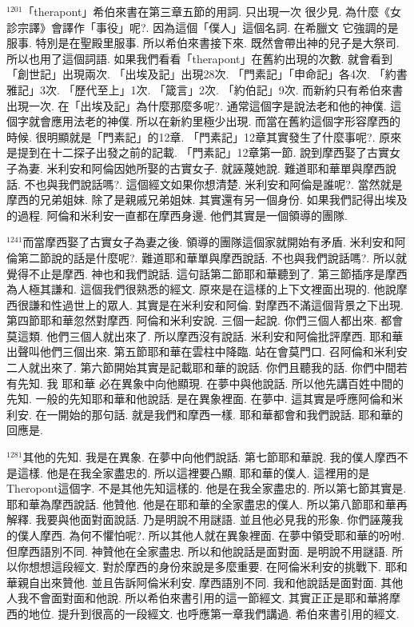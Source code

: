 \documentclass{book}
\begin{document}
$^{1201}$「therapont」希伯來書在第三章五節的用詞.
只出現一次 很少見.
為什麼《女診宗譯》會譯作「事役」呢?.
因為這個「僕人」這個名詞.
在希臘文 它強調的是服事.
特別是在聖殿里服事.
所以希伯來書接下來.
既然會帶出神的兒子是大祭司.
所以也用了這個詞語.
如果我們看看「therapont」在舊約出現的次數.
就會看到「創世記」出現兩次.
「出埃及記」出現28次.
「門素記」「申命記」各4次.
「約書雅記」3次.
「歷代至上」1次.
「箴言」2次.
「約伯記」9次.
而新約只有希伯來書出現一次.
在「出埃及記」為什麼那麼多呢?.
通常這個字是說法老和他的神僕.
這個字就會應用法老的神僕.
所以在新約里極少出現.
而當在舊約這個字形容摩西的時候.
很明顯就是「門素記」的12章.
「門素記」12章其實發生了什麼事呢?.
原來是提到在十二探子出發之前的記載.
「門素記」12章第一節.
說到摩西娶了古實女子為妻.
米利安和阿倫因她所娶的古實女子.
就誣蔑她說.
難道耶和華單與摩西說話.
不也與我們說話嗎?.
這個經文如果你想清楚.
米利安和阿倫是誰呢?.
當然就是摩西的兄弟姐妹.
除了是親戚兄弟姐妹.
其實還有另一個身份.
如果我們記得出埃及的過程.
阿倫和米利安一直都在摩西身邊.
他們其實是一個領導的團隊.

$^{1241}$而當摩西娶了古實女子為妻之後.
領導的團隊這個家就開始有矛盾.
米利安和阿倫第二節說的話是什麼呢?.
難道耶和華單與摩西說話.
不也與我們說話嗎?.
所以就覺得不止是摩西.
神也和我們說話.
這句話第二節耶和華聽到了.
第三節插序是摩西為人極其謙和.
這個我們很熟悉的經文.
原來是在這樣的上下文裡面出現的.
他說摩西很謙和性過世上的眾人.
其實是在米利安和阿倫.
對摩西不滿這個背景之下出現.
第四節耶和華忽然對摩西.
阿倫和米利安說.
三個一起說.
你們三個人都出來.
都會莫這類.
他們三個人就出來了.
所以摩西沒有說話.
米利安和阿倫批評摩西.
耶和華出聲叫他們三個出來.
第五節耶和華在雲柱中降臨.
站在會莫門口.
召阿倫和米利安二人就出來了.
第六節開始其實是記載耶和華的說話.
你們且聽我的話.
你們中間若有先知.
我 耶和華 必在異象中向他顯現.
在夢中與他說話.
所以他先講百姓中間的先知.
一般的先知耶和華和他說話.
是在異象裡面.
在夢中.
這其實是呼應阿倫和米利安.
在一開始的那句話.
就是我們和摩西一樣.
耶和華都會和我們說話.
耶和華的回應是.

$^{1281}$其他的先知.
我是在異象.
在夢中向他們說話.
第七節耶和華說.
我的僕人摩西不是這樣.
他是在我全家盡忠的.
所以這裡要凸顯.
耶和華的僕人.
這裡用的是Theropont這個字.
不是其他先知這樣的.
他是在我全家盡忠的.
所以第七節其實是.
耶和華為摩西說話.
他贊他.
他是在耶和華的全家盡忠的僕人.
所以第八節耶和華再解釋.
我要與他面對面說話.
乃是明說不用謎語.
並且他必見我的形象.
你們誣蔑我的僕人摩西.
為何不懼怕呢?.
所以其他人就在異象裡面.
在夢中領受耶和華的吩咐.
但摩西語別不同.
神贊他在全家盡忠.
所以和他說話是面對面.
是明說不用謎語.
所以你想想這段經文.
對於摩西的身份來說是多麼重要.
在阿倫米利安的挑戰下.
耶和華親自出來贊他.
並且告訴阿倫米利安.
摩西語別不同.
我和他說話是面對面.
其他人我不會面對面和他說.
所以希伯來書引用的這一節經文.
其實正正是耶和華將摩西的地位.
提升到很高的一段經文.
也呼應第一章我們講過.
希伯來書引用的經文.
\end{document}

